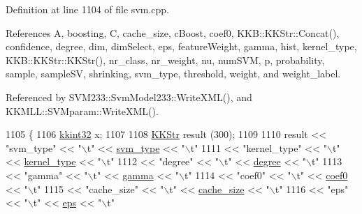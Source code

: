 Definition at line 1104 of file svm.\+cpp.



References A, boosting, C, cache\+\_\+size, c\+Boost, coef0, K\+K\+B\+::\+K\+K\+Str\+::\+Concat(), confidence, degree, dim, dim\+Select, eps, feature\+Weight, gamma, hist, kernel\+\_\+type, K\+K\+B\+::\+K\+K\+Str\+::\+K\+K\+Str(), nr\+\_\+class, nr\+\_\+weight, nu, num\+S\+VM, p, probability, sample, sample\+SV, shrinking, svm\+\_\+type, threshold, weight, and weight\+\_\+label.



Referenced by S\+V\+M233\+::\+Svm\+Model233\+::\+Write\+X\+M\+L(), and K\+K\+M\+L\+L\+::\+S\+V\+Mparam\+::\+Write\+X\+M\+L().


\begin{DoxyCode}
1105 \{
1106   \hyperlink{namespace_k_k_b_a8fa4952cc84fda1de4bec1fbdd8d5b1b}{kkint32}  x;
1107 
1108   \hyperlink{class_k_k_b_1_1_k_k_str}{KKStr}  result (300);
1109 
1110   result << \textcolor{stringliteral}{"svm\_type"}    << \textcolor{stringliteral}{"\(\backslash\)t"}  << \hyperlink{struct_s_v_m233_1_1svm__parameter_aa4cc55eaf546e2edb0ff62c5a5f8466e}{svm\_type}       << \textcolor{stringliteral}{"\(\backslash\)t"}
1111          << \textcolor{stringliteral}{"kernel\_type"} << \textcolor{stringliteral}{"\(\backslash\)t"}  << \hyperlink{struct_s_v_m233_1_1svm__parameter_a262be7c9cc8bb14e8bd3476c19eb52dc}{kernel\_type}    << \textcolor{stringliteral}{"\(\backslash\)t"}
1112          << \textcolor{stringliteral}{"degree"}      << \textcolor{stringliteral}{"\(\backslash\)t"}  << \hyperlink{struct_s_v_m233_1_1svm__parameter_abb71ffd3ed9223b5239971d18c59f6fe}{degree}         << \textcolor{stringliteral}{"\(\backslash\)t"}
1113          << \textcolor{stringliteral}{"gamma"}       << \textcolor{stringliteral}{"\(\backslash\)t"}  << \hyperlink{struct_s_v_m233_1_1svm__parameter_a39ac3a8cfe2358a6e58ef83ad301019a}{gamma}          << \textcolor{stringliteral}{"\(\backslash\)t"}
1114          << \textcolor{stringliteral}{"coef0"}       << \textcolor{stringliteral}{"\(\backslash\)t"}  << \hyperlink{struct_s_v_m233_1_1svm__parameter_a50a9e4226133254cd1fd3bd57f8c6331}{coef0}          << \textcolor{stringliteral}{"\(\backslash\)t"}
1115          << \textcolor{stringliteral}{"cache\_size"}  << \textcolor{stringliteral}{"\(\backslash\)t"}  << \hyperlink{struct_s_v_m233_1_1svm__parameter_a38b5463e773456737b9a3c0621d75048}{cache\_size}     << \textcolor{stringliteral}{"\(\backslash\)t"}
1116          << \textcolor{stringliteral}{"eps"}         << \textcolor{stringliteral}{"\(\backslash\)t"}  << \hyperlink{struct_s_v_m233_1_1svm__parameter_a0805c5f7c672e3a2c36a278d513b674f}{eps}            << \textcolor{stringliteral}{"\(\backslash\)t"}

\end{DoxyCode}
